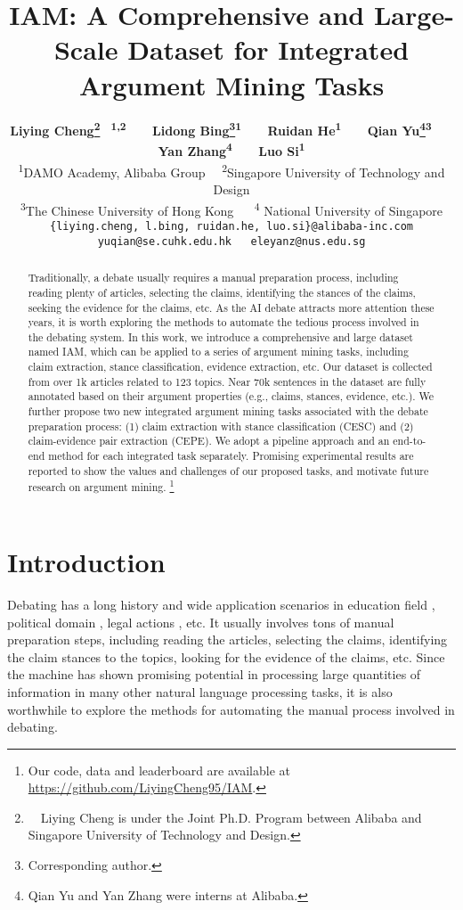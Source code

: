 \documentclass[11pt]{article}
\title{IAM: A Comprehensive and Large-Scale Dataset for Integrated Argument Mining Tasks}
\author{
\textbf{
Liying Cheng\thanks{~~Liying Cheng is under the Joint Ph.D. Program between Alibaba and Singapore University of Technology and Design.} \textsuperscript{\rm ~1,2}~~~ 
Lidong Bing\thanks{ Corresponding author.}\textsuperscript{\rm 1}~~~
Ruidan He\textsuperscript{\rm 1}~~~
Qian Yu\thanks{Qian Yu and Yan Zhang were interns at Alibaba.}\textsuperscript{\rm 3}~~~
Yan Zhang\textsuperscript{\rm 4}~~~
Luo Si\textsuperscript{\rm 1}}\\
\textsuperscript{\rm 1}DAMO Academy, Alibaba Group~~
\textsuperscript{\rm 2}Singapore University of Technology and Design
\\
\textsuperscript{\rm 3}The Chinese University of Hong Kong ~~
\textsuperscript{\rm 4} National University of Singapore\\
{\tt\{liying.cheng, l.bing, ruidan.he, luo.si\}@alibaba-inc.com}
\\
{\tt yuqian@se.cuhk.edu.hk~~~eleyanz@nus.edu.sg}
}
\begin{document}
\maketitle
\begin{abstract}
Traditionally, a debate usually requires a manual preparation process, including reading plenty of articles, selecting the claims, identifying the stances of the claims, seeking the evidence for the claims, etc.
As the AI debate attracts more attention these years, it is worth exploring the methods to automate the tedious process involved in the debating system.
In this work, we introduce a comprehensive and large dataset named IAM, which can be applied to a series of argument mining tasks, including claim extraction, stance classification, evidence extraction, etc.
Our dataset is collected from over 1k articles related to 123 topics.
Near 70k sentences in the dataset are fully annotated based on their argument properties (e.g., claims, stances, evidence, etc.).
We further propose two new integrated argument mining tasks associated with the debate preparation process: (1) claim extraction with stance classification (CESC) and (2) claim-evidence pair extraction (CEPE).
We adopt a pipeline approach and an end-to-end method for each integrated task separately.
Promising experimental results are reported to show the values and challenges of our proposed tasks, and motivate future research on argument mining.
\footnote{Our code, data and leaderboard are available at \url{https://github.com/LiyingCheng95/IAM}.}

\end{abstract}

\section{Introduction}
Debating has a long history and wide application scenarios in education field \cite{stab2014identifying,persing2016end,stab2017parsing}, political domain \cite{lippi2016argument,duthie2016mining,menini2018never}, legal actions \cite{mochales2011argumentation,grabmair2015introducing,teruel2018increasing}, etc.
It usually involves tons of manual preparation steps, including reading the articles, selecting the claims, identifying the claim stances to the topics, looking for the evidence of the claims, etc.
Since the machine has shown promising potential in processing large quantities of information in many other natural language processing tasks, it is also worthwhile to explore the methods for automating the manual process involved in debating. 
\end{document}
